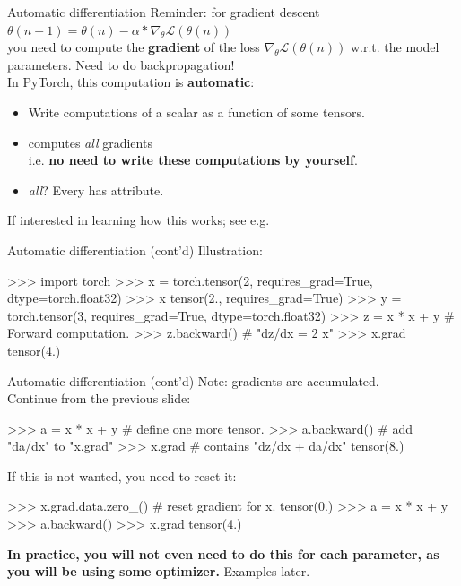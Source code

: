 
\begin{frame}{Automatic differentiation}
Reminder: for gradient descent
$\theta(n+1) = \theta(n) - \alpha * \nabla_{\theta} \mathcal{L}(\theta(n))$\\
you need to compute the \textbf{gradient} of the loss $\nabla_{\theta} \mathcal{L}(\theta(n))$ w.r.t. the model parameters. Need to do backpropagation!\\
\vsp
\vsp
In PyTorch, this computation is \textbf{automatic}:
\begin{itemize}
\item Write computations of a scalar  as a function of some tensors.
\item {} computes \textit{all} gradients\\ i.e. \textbf{no need to write these computations by yourself}.
\item \textit{all}? Every  has  attribute.
\end{itemize}
\vsp
If interested in learning how this works; see e.g. 
\end{frame}

\begin{frame}[fragile]{Automatic differentiation (cont'd)}
Illustration:
\begin{python}
>>> import torch
>>> x = torch.tensor(2, requires_grad=True, dtype=torch.float32)
>>> x
tensor(2., requires_grad=True)
>>> y = torch.tensor(3, requires_grad=True, dtype=torch.float32)
>>> z = x * x + y  # Forward computation.
>>> z.backward()  # "dz/dx = 2 x"
>>> x.grad
tensor(4.)
\end{python}
\end{frame}

\begin{frame}[fragile]{Automatic differentiation (cont'd)}
\vspace{-3mm}
Note: gradients are accumulated.\\
Continue from the previous slide:
\begin{python}
>>> a = x * x + y  # define one more tensor.
>>> a.backward()  # add "da/dx" to "x.grad"
>>> x.grad  # contains "dz/dx + da/dx"
tensor(8.)
\end{python}
If this is not wanted, you need to reset it:
\begin{python}
>>> x.grad.data.zero_()  # reset gradient for x.
tensor(0.)
>>> a = x * x + y
>>> a.backward()
>>> x.grad
tensor(4.)
\end{python}
\textbf{In practice, you will not even need to do this for each parameter,
as you will be using some optimizer.} Examples later.
\end{frame}

